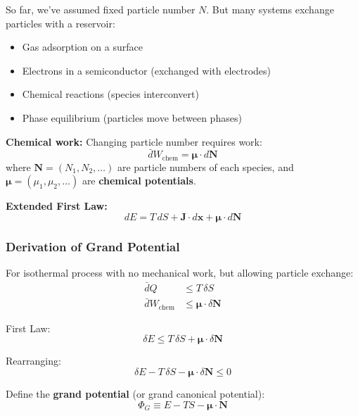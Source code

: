 \documentclass[9pt,twocoloumn]{article}
\begin{document}
So far, we've assumed fixed particle number $N$. But many systems exchange particles with a reservoir:
\begin{itemize}
    \item Gas adsorption on a surface
    \item Electrons in a semiconductor (exchanged with electrodes)
    \item Chemical reactions (species interconvert)
    \item Phase equilibrium (particles move between phases)
\end{itemize}

\textbf{Chemical work:} Changing particle number requires work:
\begin{equation}
\bar{d}W_{\text{chem}} = \boldsymbol{\mu} \cdot d\mathbf{N}
\end{equation}
where $\mathbf{N} = (N_1, N_2, \ldots)$ are particle numbers of each species, and $\boldsymbol{\mu} = (\mu_1, \mu_2, \ldots)$ are \textbf{chemical potentials}.

\textbf{Extended First Law:}
\begin{equation}
dE = T \, dS + \mathbf{J} \cdot d\mathbf{x} + \boldsymbol{\mu} \cdot d\mathbf{N}
\end{equation}

\subsubsection{Derivation of Grand Potential}

For isothermal process with no mechanical work, but allowing particle exchange:
\begin{align}
\bar{d}Q &\leq T \, \delta S \\
\bar{d}W_{\text{chem}} &\leq \boldsymbol{\mu} \cdot \delta \mathbf{N}
\end{align}

First Law:
\begin{equation}
\delta E \leq T \, \delta S + \boldsymbol{\mu} \cdot \delta \mathbf{N}
\end{equation}

Rearranging:
\begin{equation}
\delta E - T \, \delta S - \boldsymbol{\mu} \cdot \delta \mathbf{N} \leq 0
\end{equation}

Define the \textbf{grand potential} (or grand canonical potential):
\begin{equation}
\boxed{\Phi_G \equiv E - TS - \boldsymbol{\mu} \cdot \mathbf{N}}
\end{equation}
\end{document}
